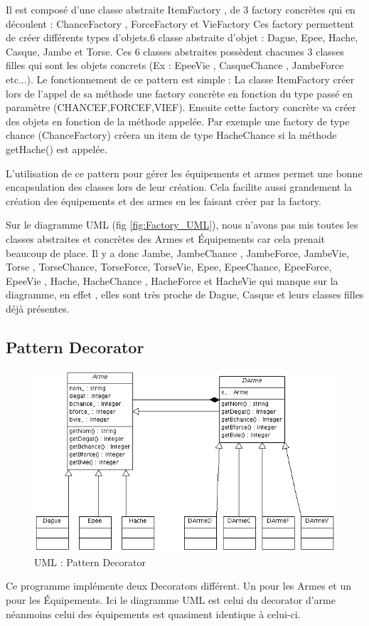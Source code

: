 \documentclass[a4paper]{article}
\begin{document}
Il est composé d'une classe abstraite ItemFactory , de 3 factory concrètes qui en découlent : ChanceFactory , ForceFactory et VieFactory
Ces factory permettent de créer différents types d'objets.6 classe abstraite d'objet : Dague, Epee, Hache, Casque, Jambe et Torse.
Ces 6 classes abstraites possèdent chacunes 3 classes filles qui sont les objets concrets (Ex : EpeeVie , CasqueChance , JambeForce etc...).
Le fonctionnement de ce pattern est simple : La classe ItemFactory créer lors de l'appel de sa méthode une factory concrète en fonction du type
passé en paramètre (CHANCEF,FORCEF,VIEF). Ensuite cette factory concrète va créer des objets en fonction de la méthode appelée.
Par exemple une factory de type chance (ChanceFactory) créera un item de type HacheChance si la méthode getHache() est appelée.

L'utilisation de ce pattern pour gérer les équipements et armes permet une bonne encapsulation des classes lors de leur création. Cela facilite
aussi grandement la création des équipements et des armes en les faisant créer par la factory.


Sur le diagramme UML (fig \ref{fig:Factory_UML}), nous n'avons pas mis toutes les classes abstraites et concrètes des Armes et Équipements car cela prenait beaucoup de place.
Il y a donc Jambe, JambeChance , JambeForce, JambeVie, Torse , TorseChance, TorseForce, TorseVie, Epee, EpeeChance, EpeeForce, EpeeVie , Hache,
HacheChance , HacheForce et HacheVie qui manque sur la diagramme, en effet , elles sont très proche de Dague, Casque et leurs classes filles
déjà présentes.

		

      \subsection{Pattern Decorator}
      \begin{figure}[h]
			\centering
				\includegraphics[width=15cm]{./Decorator_UML.png}
			\caption{\label{fig:Decorator_UML}UML : Pattern Decorator}
			
		\end{figure}
Ce programme implémente deux Decorators différent. Un pour les Armes et un pour les Équipements. Ici le diagramme UML est celui du decorator
d'arme néanmoins celui des équipements est quasiment identique à celui-ci.
\end{document}
